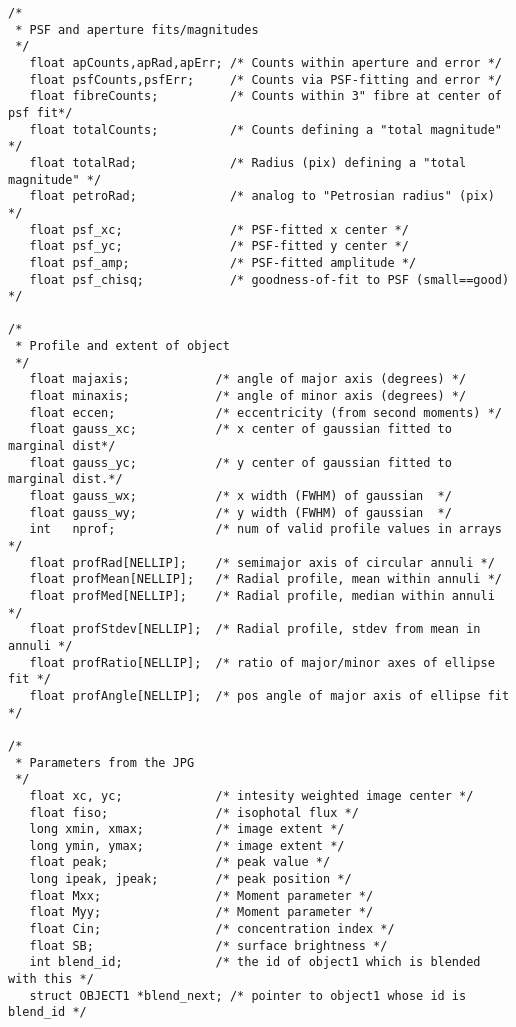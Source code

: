 {\begin{itemize}
\begin{verbatim}
/*
 * PSF and aperture fits/magnitudes
 */
   float apCounts,apRad,apErr; /* Counts within aperture and error */
   float psfCounts,psfErr;     /* Counts via PSF-fitting and error */
   float fibreCounts;          /* Counts within 3" fibre at center of psf fit*/
   float totalCounts;          /* Counts defining a "total magnitude" */
   float totalRad;             /* Radius (pix) defining a "total magnitude" */
   float petroRad;             /* analog to "Petrosian radius" (pix) */
   float psf_xc;               /* PSF-fitted x center */
   float psf_yc;               /* PSF-fitted y center */
   float psf_amp;              /* PSF-fitted amplitude */
   float psf_chisq;            /* goodness-of-fit to PSF (small==good) */

/*
 * Profile and extent of object
 */
   float majaxis;            /* angle of major axis (degrees) */
   float minaxis;            /* angle of minor axis (degrees) */
   float eccen;              /* eccentricity (from second moments) */
   float gauss_xc;           /* x center of gaussian fitted to marginal dist*/
   float gauss_yc;           /* y center of gaussian fitted to marginal dist.*/
   float gauss_wx;           /* x width (FWHM) of gaussian  */
   float gauss_wy;           /* y width (FWHM) of gaussian  */
   int   nprof;              /* num of valid profile values in arrays */
   float profRad[NELLIP];    /* semimajor axis of circular annuli */
   float profMean[NELLIP];   /* Radial profile, mean within annuli */
   float profMed[NELLIP];    /* Radial profile, median within annuli */
   float profStdev[NELLIP];  /* Radial profile, stdev from mean in annuli */
   float profRatio[NELLIP];  /* ratio of major/minor axes of ellipse fit */
   float profAngle[NELLIP];  /* pos angle of major axis of ellipse fit */

/*
 * Parameters from the JPG
 */
   float xc, yc;             /* intesity weighted image center */
   float fiso;               /* isophotal flux */
   long xmin, xmax;          /* image extent */
   long ymin, ymax;          /* image extent */
   float peak;               /* peak value */
   long ipeak, jpeak;        /* peak position */
   float Mxx;                /* Moment parameter */
   float Myy;                /* Moment parameter */
   float Cin;                /* concentration index */
   float SB;                 /* surface brightness */
   int blend_id;             /* the id of object1 which is blended with this */
   struct OBJECT1 *blend_next; /* pointer to object1 whose id is blend_id */


\end{verbatim}
\end{itemize}}
